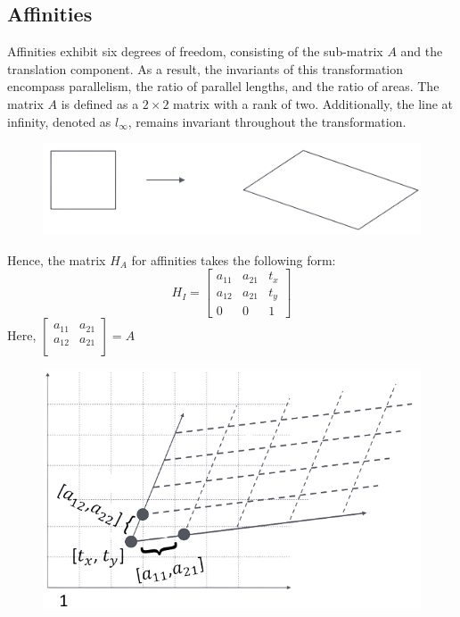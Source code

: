 \subsection*{Affinities}
Affinities exhibit six degrees of freedom, consisting of the sub-matrix $A$ and the translation component. 
As a result, the invariants of this transformation encompass parallelism, the ratio of parallel lengths, and the ratio of areas. 
The matrix $A$ is defined as a $2 \times 2$ matrix with a rank of two. 
Additionally, the line at infinity, denoted as $l_{\infty}$, remains invariant throughout the transformation.
\begin{figure}[H]
    \centering
    \includegraphics[width=0.25\linewidth]{images/affinities.png}
\end{figure}
Hence, the matrix $H_A$ for affinities takes the following form:
\[H_I=
\begin{bmatrix}
    a_{11} & a_{21} & t_x \\
    a_{12} & a_{21} & t_y \\
    0 & 0 & 1
\end{bmatrix}\]
Here, $
\begin{bmatrix}
    a_{11} & a_{21} \\
    a_{12} & a_{21} \\
\end{bmatrix}
=A$
\begin{figure}[H]
    \centering
    \includegraphics[width=0.3\linewidth]{images/affinities1.png}
\end{figure}

